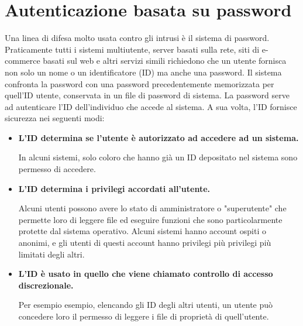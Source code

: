 \section{Autenticazione basata su password}

Una linea di difesa molto usata contro gli intrusi è il sistema di password. Praticamente tutti i sistemi multiutente, server basati sulla rete, siti di e-commerce basati sul web e altri servizi simili richiedono che un utente fornisca non solo un nome o un identificatore (ID) ma anche una password. Il sistema confronta la password con una password precedentemente memorizzata per quell'ID utente, conservata in un file di password di sistema. La password serve ad autenticare l'ID dell'individuo che accede al sistema. A sua volta, l'ID fornisce sicurezza nei seguenti modi:
\begin{itemize}
    \item \textbf{L'ID determina se l'utente è autorizzato ad accedere ad un sistema.}
    
    In alcuni sistemi, solo coloro che hanno già un ID depositato nel sistema sono permesso di accedere.
    
    \item \textbf{L'ID determina i privilegi accordati all'utente.}
    
    Alcuni utenti possono avere lo stato di amministratore o "superutente" che permette loro di leggere file ed eseguire funzioni che sono particolarmente protette dal sistema operativo. Alcuni sistemi hanno account ospiti o anonimi, e gli utenti di questi account hanno privilegi più privilegi più limitati degli altri.
    
    \item \textbf{L'ID è usato in quello che viene chiamato controllo di accesso discrezionale.}
    
    Per esempio esempio, elencando gli ID degli altri utenti, un utente può concedere loro il permesso di leggere i file di proprietà di quell'utente.
\end{itemize}
\newpage
